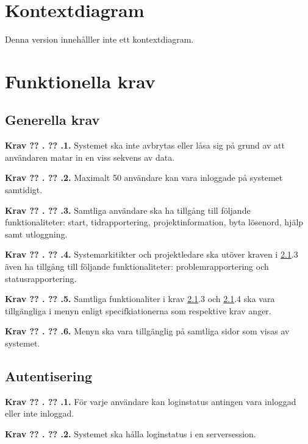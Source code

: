 \documentclass[a4paper]{article}
\newcommand\getcurrentref[1]{%
 \ifnumequal{\value{#1}}{0}
  {??}
  {\the\value{#1}}%
}
\newcommand\requirement[2]{
	\numberedrow{Krav}{#1}{#2}
}
\newcommand\numberedrow[3]{
	\noindent
	\textbf{#1 \getcurrentref{section}.\getcurrentref{subsection}.#2.} #3
	
}
\begin{document}
\section{Kontextdiagram}
Denna version innehålller inte ett kontextdiagram.
\section{Funktionella krav}
\subsection{Generella krav}
\label{krav-funk-gen}

 \requirement{1}{Systemet ska inte avbrytas eller låsa sig på grund av att användaren matar in en viss sekvens av data.}
\requirement{2}{Maximalt 50 användare kan vara inloggade på systemet samtidigt.}
\requirement{3}{Samtliga användare ska ha tillgång till följande funktionaliteter: start, tidrapportering, projektinformation, byta lösenord, hjälp samt utloggning.}
\requirement{4}{Systemarkitikter och projektledare ska utöver kraven i \ref{krav-funk-gen}.3 även ha tillgång till följande funktionaliteter: problemrapportering och statusrapportering.}
\requirement{5}{Samtliga funktionaliter i krav \ref{krav-funk-gen}.3 och \ref{krav-funk-gen}.4 ska vara tillgängliga i menyn enligt specifkiationerna som respektive krav anger.}
\requirement{6}{Menyn ska vara tillgänglig på samtliga sidor som visas av systemet.}
 
\subsection{Autentisering}
\label{krav-funk-aut}
\requirement{1}{För varje användare kan loginstatus antingen vara inloggad eller inte inloggad.}
\requirement{2}{Systemet ska hålla loginstatus i en serversession.}

\end{document}

